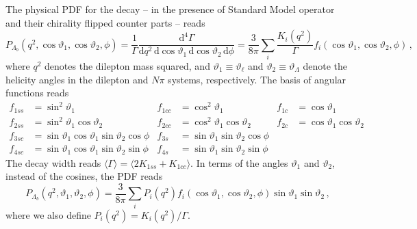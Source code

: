 \documentclass[aps,prd,reprint,nofootinbib,preprintnumbers]{revtex4}
\newcommand{\dd}{\text{d}}
\renewcommand{\theta}{\vartheta}
\begin{document}
The physical PDF for the decay -- in the presence of Standard Model operator and their chirality flipped counter parts -- reads \cite{Boeer:2014xx}
\begin{equation}
    P_{\Lambda_b}(q^2, \cos\theta_1, \cos\theta_2, \phi) = \frac{1}{\Gamma} \frac{\dd^4\Gamma}{\dd q^2\,\dd \cos\theta_1\,\dd \cos\theta_2\,\dd \phi} = \frac{3}{8\pi} \sum_i \frac{K_{i}(q^2)}{\Gamma} f_i(\cos\theta_1, \cos\theta_2, \phi)\,,
\end{equation}
where $q^2$ denotes the dilepton mass squared, and $\theta_1 \equiv \theta_\ell$ and $\theta_2 \equiv \theta_\Lambda$ denote the
helicity angles in the dilepton and $N\pi$ systems, respectively. The basis of angular functions reads
\begin{equation}
    \begin{aligned}
        f_{1ss} & = \sin^2\theta_1 &
        f_{1cc} & = \cos^2\theta_1 &
        f_{1c}  & = \cos\theta_1\\
        f_{2ss} & = \sin^2\theta_1 \cos\theta_2 &
        f_{2cc} & = \cos^2\theta_1 \cos\theta_2 &
        f_{2c}  & = \cos\theta_1   \cos\theta_2 \\
        f_{3sc} & = \sin\theta_1 \cos\theta_1 \sin\theta_2 \cos\phi &
        f_{3s}  & = \sin\theta_1              \sin\theta_2 \cos\phi \\
        f_{4sc} & = \sin\theta_1 \cos\theta_1 \sin\theta_2 \sin\phi &
        f_{4s}  & = \sin\theta_1              \sin\theta_2 \sin\phi
    \end{aligned}
\end{equation}
The decay width reads $\langle\Gamma\rangle = \langle2 K_{1ss} + K_{1cc}\rangle$. In terms of the angles $\theta_1$ and $\theta_2$, instead of the cosines, the PDF reads
\begin{equation}
    P_{\Lambda_b}(q^2, \theta_1, \theta_2, \phi) = \frac{3}{8\pi} \sum_i P_i(q^2) f_i(\cos\theta_1, \cos\theta_2, \phi) \sin\theta_1 \sin\theta_2\,,
\end{equation}
where we also define $P_i(q^2) = K_i(q^2) / \Gamma$.
\end{document}
